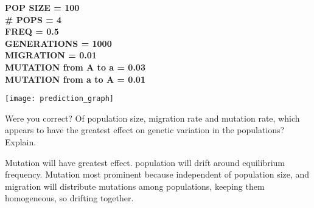\documentclass[11pt, addpoints]{exam}
\begin{document}
\begin{questions}
\ifprintanswers
	{\bfseries %
	POP SIZE = 100\\
	\# POPS = 4\\
	FREQ = 0.5\\
	GENERATIONS = 1000\\
	MIGRATION = 0.01 \\
	MUTATION from A to a = 0.03\\
	MUTATION from a to A = 0.01}\vspace*{14\baselineskip}
\else
	\begin{center}
		\texttt{[image: prediction\_graph]}
	\end{center}
\fi

\question[2]
Were you correct? Of population size, migration rate and
mutation rate, which appears to have the greatest effect on genetic
variation in the populations? Explain.

\begin{solution}
Mutation will have greatest effect. population will drift around equilibrium frequency. Mutation most prominent because independent of population size, and migration will distribute mutations among populations, keeping them homogeneous, so drifting together.
\end{solution}
\end{questions}
\end{document}
